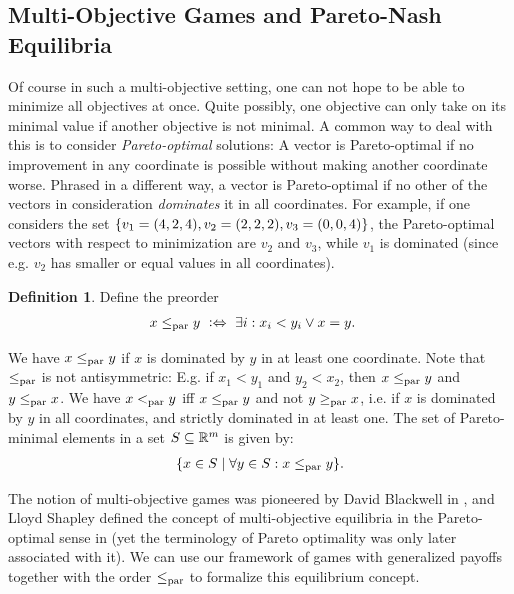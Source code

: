 \documentclass[a4paper]{scrreprt}
\theoremstyle{definition}
\newtheorem{defn}[thm]{Definition} %
\begin{document}
    \subsection{Multi-Objective Games and Pareto-Nash Equilibria}
    Of course in such a multi-objective setting, one can not hope to be able to minimize all objectives at once. Quite possibly, one objective can only take on its minimal value if another objective is not minimal. A common way to deal with this is to consider \emph{Pareto-optimal} solutions:
    A vector is Pareto-optimal if no improvement in any coordinate is possible without making another coordinate worse. Phrased in a different way, a vector is Pareto-optimal if no other of the vectors in consideration \emph{dominates} it in all coordinates.
    For example, if one considers the set $\{v_1 = (4, 2, 4), v_2 = (2, 2, 2), v_3 = (0, 0, 4)\}$, the Pareto-optimal vectors with respect to minimization are $v_2$ and $v_3$, while $v_1$ is dominated (since e.g. $v_2$ has smaller or equal values in all coordinates).
    
    \begin{defn}
        Define the preorder
        \begin{align*}
        	x \leq_{\text{par}} y ~ & \mathrel{\vcentcolon\Leftrightarrow}~ \exists i: x_i < y_i \vee x = y.
        \end{align*}
    \end{defn}
    We have $x \leq_{\text{par}} y$ if $x$ is dominated by $y$ in at least one coordinate.
    Note that $\leq_{\text{par}}$ is not antisymmetric: E.g. if $x_1 < y_1$ and $y_2 < x_2$, then $x \leq_{\text{par}} y$ and $y \leq_{\text{par}} x$.
    We have $x <_{\text{par}} y$ iff $x \leq_{\text{par}} y$ and not $y \geq_{\text{par}} x$, i.e. if $x$ is dominated by $y$ in all coordinates, and strictly dominated in at least one.
    The set of Pareto-minimal elements in a set $S \subseteq \mathbb{R}^m$ is given by:
    \begin{gather*}
        \{x \in S \mid \forall y \in S: x \leq_{\text{par}} y\}.
    \end{gather*}    
    
    The notion of multi-objective games was pioneered by David Blackwell in \cite{bib:blackwellVectorPayoffs}, and Lloyd Shapley defined the concept of multi-objective equilibria in the Pareto-optimal sense in \cite{bib:shapleyMultiobjectiveEquilibriumPoints} (yet the terminology of Pareto optimality was only later associated with it).
    We can use our framework of games with generalized payoffs together with the order $\leq_{\text{par}}$ to formalize this equilibrium concept.
    
\end{document}
